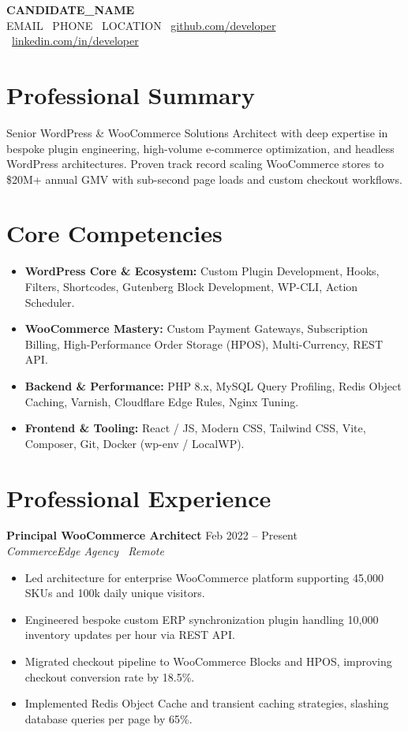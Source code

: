 \documentclass[10pt,a4paper]{article}
\begin{document}
\begin{center}
    {\huge \textbf{{{CANDIDATE_NAME}}}}\\[3pt]
    \small {{EMAIL}} \textbar\ {{PHONE}} \textbar\ {{LOCATION}} \textbar\ \href{https://github.com/candidate}{github.com/developer} \textbar\ \href{https://linkedin.com/in/candidate}{linkedin.com/in/developer}
\end{center}

\vspace{-4pt}
\section{Professional Summary}
Senior WordPress \& WooCommerce Solutions Architect with deep expertise in bespoke plugin engineering, high-volume e-commerce optimization, and headless WordPress architectures. Proven track record scaling WooCommerce stores to \$20M+ annual GMV with sub-second page loads and custom checkout workflows.

\section{Core Competencies}
\begin{itemize}
    \item \textbf{WordPress Core \& Ecosystem:} Custom Plugin Development, Hooks, Filters, Shortcodes, Gutenberg Block Development, WP-CLI, Action Scheduler.
    \item \textbf{WooCommerce Mastery:} Custom Payment Gateways, Subscription Billing, High-Performance Order Storage (HPOS), Multi-Currency, REST API.
    \item \textbf{Backend \& Performance:} PHP 8.x, MySQL Query Profiling, Redis Object Caching, Varnish, Cloudflare Edge Rules, Nginx Tuning.
    \item \textbf{Frontend \& Tooling:} React / JS, Modern CSS, Tailwind CSS, Vite, Composer, Git, Docker (wp-env / LocalWP).
\end{itemize}

\section{Professional Experience}
\textbf{Principal WooCommerce Architect} \hfill Feb 2022 -- Present\\
\textit{CommerceEdge Agency \textbar\ Remote}
\begin{itemize}
    \item Led architecture for enterprise WooCommerce platform supporting 45,000 SKUs and 100k daily unique visitors.
    \item Engineered bespoke custom ERP synchronization plugin handling 10,000 inventory updates per hour via REST API.
    \item Migrated checkout pipeline to WooCommerce Blocks and HPOS, improving checkout conversion rate by 18.5\%.
    \item Implemented Redis Object Cache and transient caching strategies, slashing database queries per page by 65\%.
\end{itemize}
\end{document}
